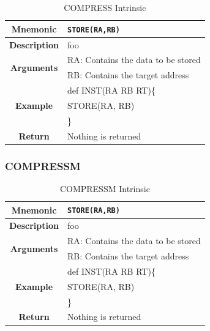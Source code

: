\documentclass{article}
\begin{document}
\begin{table}[h]
\begin{center}
\caption{COMPRESS Intrinsic}
\vspace{0.125in}
\label{tab:COMPRESSIntrinsic}
\begin{tabular}{|c|l|}
\hline
\textbf{Mnemonic} & \texttt{STORE(RA,RB)}\\
\hline
\textbf{Description} & foo\\
\hline
\multirow{2}{*}{\textbf{Arguments}} & RA: Contains the data to be stored\\
                          			     & RB: Contains the target address \\
\hline
\multirow{3}{*}{\textbf{Example}} & def INST(RA RB RT)\{\\
                          			  &   STORE(RA, RB)\\
                                                    & \}\\
\hline
\textbf{Return} & Nothing is returned\\                                                    
\hline
\end{tabular}
\end{center}
\end{table}

\clearpage
\subsubsection{COMPRESSM}
\label{sec:COMPRESSM}

\begin{table}[h]
\begin{center}
\caption{COMPRESSM Intrinsic}
\vspace{0.125in}
\label{tab:COMPRESSMIntrinsic}
\begin{tabular}{|c|l|}
\hline
\textbf{Mnemonic} & \texttt{STORE(RA,RB)}\\
\hline
\textbf{Description} & foo\\
\hline
\multirow{2}{*}{\textbf{Arguments}} & RA: Contains the data to be stored\\
                          			     & RB: Contains the target address \\
\hline
\multirow{3}{*}{\textbf{Example}} & def INST(RA RB RT)\{\\
                          			  &   STORE(RA, RB)\\
                                                    & \}\\
\hline
\textbf{Return} & Nothing is returned\\                                                    
\hline
\end{tabular}
\end{center}
\end{table}
\end{document}
